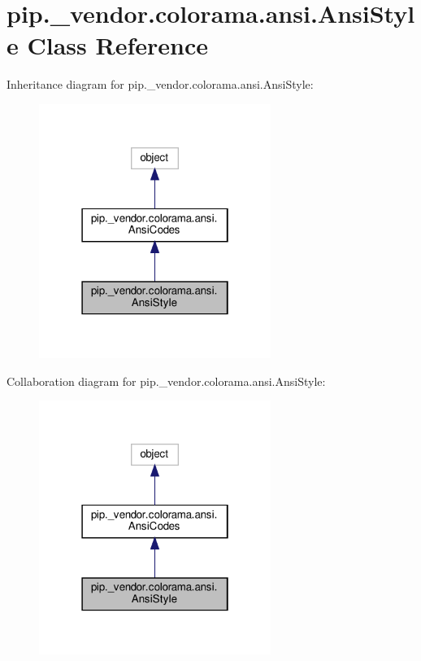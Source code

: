 \hypertarget{classpip_1_1__vendor_1_1colorama_1_1ansi_1_1AnsiStyle}{}\section{pip.\+\_\+vendor.\+colorama.\+ansi.\+Ansi\+Style Class Reference}
\label{classpip_1_1__vendor_1_1colorama_1_1ansi_1_1AnsiStyle}


Inheritance diagram for pip.\+\_\+vendor.\+colorama.\+ansi.\+Ansi\+Style\+:
\nopagebreak
\begin{figure}[H]
\begin{center}
\leavevmode
\includegraphics[width=214pt]{classpip_1_1__vendor_1_1colorama_1_1ansi_1_1AnsiStyle__inherit__graph}
\end{center}
\end{figure}


Collaboration diagram for pip.\+\_\+vendor.\+colorama.\+ansi.\+Ansi\+Style\+:
\nopagebreak
\begin{figure}[H]
\begin{center}
\leavevmode
\includegraphics[width=214pt]{classpip_1_1__vendor_1_1colorama_1_1ansi_1_1AnsiStyle__coll__graph}
\end{center}
\end{figure}
